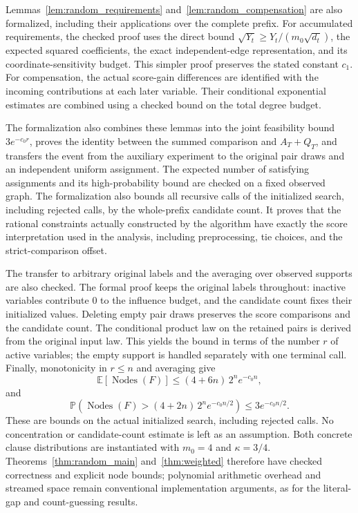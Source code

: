 \documentclass[11pt,a4paper]{article}
\theoremstyle{definition}
\theoremstyle{remark}
\newcommand{\E}{\mathbb E}
\newcommand{\Prb}{\mathbb P}
\begin{document}
Lemmas~\ref{lem:random_requirements} and~\ref{lem:random_compensation}
are also formalized, including their applications over the complete
prefix. For accumulated requirements, the checked proof uses the direct
bound $\sqrt{Y_t}\ge Y_t/(m_0\sqrt{d_t})$, the expected squared
coefficients, the exact independent-edge representation, and its
coordinate-sensitivity budget. This simpler proof preserves the stated
constant $c_1$. For compensation, the actual score-gain differences are
identified with the incoming contributions at each later variable.
Their conditional exponential estimates are combined using a checked
bound on the total degree budget.

The formalization also combines these lemmas into the joint feasibility
bound $3e^{-c_0r}$, proves the identity between the summed comparison
and $A_T+Q_T$, and transfers the event from the auxiliary experiment to
the original pair draws and an independent uniform assignment.
The expected number of satisfying assignments and its high-probability
bound are checked on a fixed observed graph. The formalization also
bounds all recursive calls of the initialized search, including rejected
calls, by the whole-prefix candidate count. It proves that the rational
constraints actually constructed by the algorithm have exactly the score
interpretation used in the analysis, including preprocessing, tie choices,
and the strict-comparison offset.

The transfer to arbitrary original labels and the averaging over observed
supports are also checked. The formal proof keeps the original
labels throughout: inactive variables contribute $0$ to the influence
budget, and the candidate count fixes their initialized values. Deleting
empty pair draws preserves the score comparisons and the candidate count.
The conditional product law on the retained pairs is derived from the
original input law. This yields the bound in terms of the number $r$ of
active variables; the empty support is handled separately with one
terminal call. Finally, monotonicity in $r\le n$ and averaging give
\[
 \E[\operatorname{Nodes}(F)]
 \le (4+6n)\,2^n e^{-c_0n},
\]
and
\[
 \Prb\!\left(\operatorname{Nodes}(F)>(4+2n)\,2^n e^{-c_0n/2}\right)
 \le 3e^{-c_0n/2}.
\]
These are bounds on the actual initialized search, including rejected
calls. No concentration or candidate-count estimate is left as an
assumption. Both concrete clause distributions are instantiated with
$m_0=4$ and $\kappa=3/4$. Theorems~\ref{thm:random_main} and~\ref{thm:weighted}
therefore have checked correctness and explicit node bounds; polynomial
arithmetic overhead and streamed space remain conventional implementation
arguments, as for the literal-gap and count-guessing results.
\end{document}
